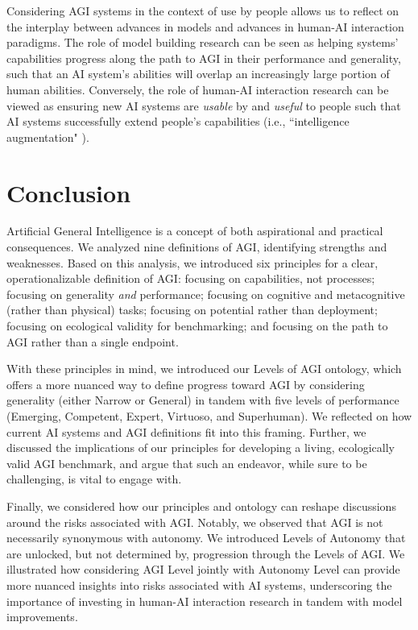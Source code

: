 \documentclass{article}
\theoremstyle{plain}
\theoremstyle{definition}
\theoremstyle{remark}
\begin{document}
Considering AGI systems in the context of use by people allows us to reflect on the interplay between advances in models and advances in human-AI interaction paradigms. The role of model building research can be seen as helping systems’ capabilities progress along the path to AGI in their performance and generality, such that an AI system’s abilities will overlap an increasingly large portion of human abilities. Conversely, the role of human-AI interaction research can be viewed as ensuring new AI systems are \textit{usable}  by and \textit{useful} to people such that AI systems successfully extend people’s capabilities (i.e., ``intelligence augmentation" \citep{brynjolfsson2022turing, ia_Englebart}).   

\section{Conclusion}

Artificial General Intelligence is a concept of both aspirational and practical consequences. We analyzed nine definitions of AGI, identifying strengths and weaknesses. Based on this analysis, we introduced six principles for a clear, operationalizable definition of AGI: focusing on capabilities, not processes; focusing on generality \textit{and} performance; focusing on cognitive and metacognitive (rather than physical) tasks; focusing on potential rather than deployment; focusing on ecological validity for benchmarking; and focusing on the path to AGI rather than a single endpoint.

With these principles in mind, we introduced our Levels of AGI ontology, which offers a more nuanced way to define progress toward AGI by considering generality (either Narrow or General) in tandem with five levels of performance (Emerging, Competent, Expert, Virtuoso, and Superhuman). We reflected on how current AI systems and AGI definitions fit into this framing. Further, we discussed the implications of our principles for developing a living, ecologically valid AGI benchmark, and argue that such an endeavor, while sure to be challenging, is vital 
to engage with.  

Finally, we considered how our principles and ontology can reshape discussions around the risks associated with AGI. Notably, we observed that AGI is not necessarily synonymous with autonomy. We introduced Levels of Autonomy that are unlocked, but not determined by, progression through the Levels of AGI. We illustrated how considering AGI Level jointly with Autonomy Level can provide more nuanced insights into risks associated with AI systems, underscoring the importance of investing in human-AI interaction research in tandem with model improvements. 
\end{document}
